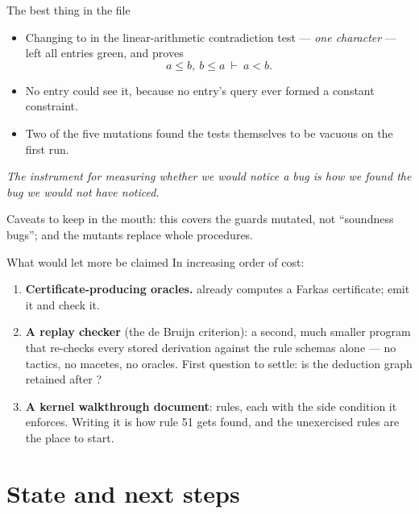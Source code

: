 \documentclass[11pt,aspectratio=169]{beamer}
\begin{document}
\begin{frame}{The best thing in the file}
  \begin{itemize}
    \item Changing  to  in the linear-arithmetic
          contradiction test --- \emph{one character} --- left all entries
          green, and proves
          \[ a \le b,\ b \le a \ \vdash\ a < b. \]
    \item No entry could see it, because no entry's query ever formed a
          constant constraint.
    \item Two of the five mutations found the tests themselves to be vacuous on
          the first run.
  \end{itemize}
  \vfill
  \begin{center}
    \emph{The instrument for measuring whether we would notice a bug is how we
    found the bug we would not have noticed.}
  \end{center}
  \vfill
  \small Caveats to keep in the mouth: this covers the \Nmut{} guards mutated,
  not ``soundness bugs''; and the mutants replace whole procedures.
\end{frame}

\begin{frame}{What would let more be claimed}
  In increasing order of cost:
  \begin{enumerate}
    \item \textbf{Certificate-producing oracles.}  already computes
          a Farkas certificate; emit it and check it.
    \item \textbf{A replay checker} (the de Bruijn criterion): a second, much
          smaller program that re-checks every stored derivation against the
          rule schemas alone --- no tactics, no macetes, no oracles. First
          question to settle: is the deduction graph retained after
          ?
    \item \textbf{A kernel walkthrough document}: \Nkernel{} rules, each with
          the side condition it enforces. Writing it is how rule 51 gets found,
          and the \Nunexer{} unexercised rules are the place to start.
  \end{enumerate}
\end{frame}

\section{State and next steps}
\end{document}
